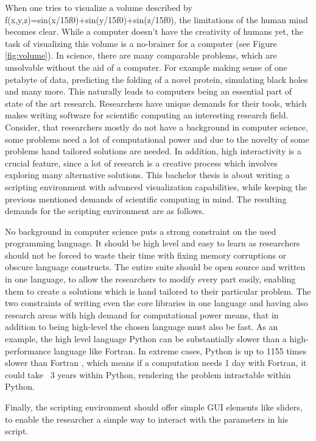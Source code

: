 When one tries to visualize a volume described by f(x,y,z)=sin(x/15f0)+sin(y/15f0)+sin(z/15f0), the limitations of the human mind becomes clear. While a computer doesn't have the creativity of humans yet, the task of visualizing this volume is a no-brainer for a computer (see Figure \ref{fig:volume}).
In science, there are many comparable problems, which are unsolvable without the aid of a computer.
For example making sense of one petabyte of data, predicting the folding of a novel protein, simulating black holes and many more.
This naturally leads to computers being an essential part of state of the art research.
Researchers have unique demands for their tools, which makes writing software for scientific computing an interesting research field.
Consider, that researchers mostly do not have a background in computer science, some problems need a lot of computational power and due to the novelty of some problems hand tailored solutions are needed. In addition, high interactivity is a crucial feature, since a lot of research is a creative process which involves exploring many alternative solutions.
This bachelor thesis is about writing a scripting environment with advanced visualization capabilities, while keeping the previous mentioned demands of scientific computing in mind.
The resulting demands for the scripting environment are as follows.

No background in computer science puts a strong constraint on the used programming language. It should be high level and easy to learn as researchers should not be forced to waste their time with fixing memory corruptions or obscure language constructs.
The entire suite should be open source and written in one language, to allow the researchers to modify every part easily, enabling them to create a solutions which is hand tailored to their particular problem.
The two constraints of writing even the core libraries in one language and having also research areas with high demand for computational power means, that in addition to being high-level the chosen language must also be fast.
As an example, the high level language Python can be substantially slower than a high-performance language like Fortran.
In extreme cases, Python is up to 1155 times slower than Fortran \cite{benchmark_python}, which means if a computation needs 1 day with Fortran, it could take ~3 years within Python, rendering the problem intractable within Python.

Finally, the scripting environment should offer simple GUI elements like sliders, to enable the researcher a simple way to interact with the parameters in his script.

